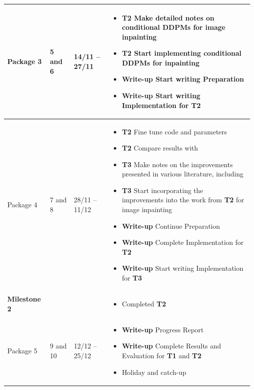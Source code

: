 \documentclass{article}
\begin{document}
\begin{longtable}{p{2.5cm}p{1.5cm}P{2.5cm}P{6.8cm}}
    Package 3 &
    5 and 6  &
    14/11 -- 27/11 &
    \begin{itemize}[label={--},noitemsep,leftmargin=*,topsep=0pt,partopsep=0pt]
        \item \textbf{T2} Make detailed notes on conditional DDPMs for image inpainting
        \item \textbf{T2} Start implementing conditional DDPMs for inpainting
        \item \textbf{Write-up} Start writing Preparation
        \item \textbf{Write-up} Start writing Implementation for \textbf{T2} 
    \end{itemize}\\
    \hline
    
    Package 4 &
    7 and 8  &
    28/11 -- 11/12 &
    \begin{itemize}[label={--},noitemsep,leftmargin=*,topsep=0pt,partopsep=0pt]
        \item \textbf{T2} Fine tune code and parameters
        \item \textbf{T2} Compare results with \cite{Saharia-2022}
        \item \textbf{T3} Make notes on the improvements presented in various literature, including \cite{Nichol-2021}
        \item \textbf{T3} Start incorporating the improvements into the work from \textbf{T2} for image inpainting
        \item \textbf{Write-up} Continue Preparation
        \item \textbf{Write-up} Complete Implementation for \textbf{T2}
        \item \textbf{Write-up} Start writing Implementation for \textbf{T3} 
    \end{itemize}\\
    \hline
    
    \textbf{Milestone 2} &
    &
    &
    \begin{itemize}[label={--},noitemsep,leftmargin=*,topsep=0pt,partopsep=0pt]
        \item Completed \textbf{T2}
    \end{itemize}\\
    \hline
    
    Package 5 &
    9 and 10  &
    12/12 -- 25/12 &
    \begin{itemize}[label={--},noitemsep,leftmargin=*,topsep=0pt,partopsep=0pt]
        \item \textbf{Write-up} Progress Report
        \item \textbf{Write-up} Complete Results and Evaluation for \textbf{T1} and \textbf{T2}
        \item Holiday and catch-up
    \end{itemize}\\
    \hline
    

\end{longtable}
\end{document}

